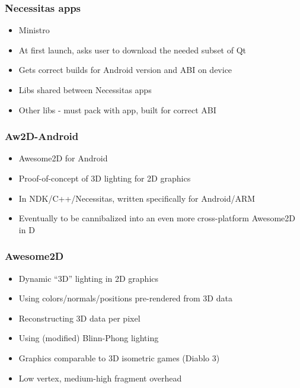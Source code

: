 \documentclass[ignorenonframetext]{beamer}
\begin{document}
\begin{frame}[fragile]
\frametitle{Necessitas apps}

\begin{itemize}

\item Ministro

\item At first launch, asks user to download the needed subset of Qt

\item Gets correct builds for Android version and ABI on device

\item Libs shared between Necessitas apps

\item Other libs - must pack with app, built for correct ABI
\end{itemize}
\end{frame}

\begin{frame}[fragile]
\frametitle{Aw2D-Android}

\begin{itemize}

\item Awesome2D for Android

\item Proof-of-concept of 3D lighting for 2D graphics

\item In NDK/C++/Necessitas, written specifically for Android/ARM

\item Eventually to be cannibalized into an even more cross-platform Awesome2D in D
\end{itemize}
\end{frame}

\begin{frame}[fragile]
\frametitle{Awesome2D}

\begin{itemize}

\item Dynamic ``3D'' lighting in 2D graphics

\item Using colors/normals/positions pre-rendered from 3D data

\item Reconstructing 3D data per pixel

\item Using (modified) Blinn-Phong lighting

\item Graphics comparable to 3D isometric games (Diablo 3)

\item Low vertex, medium-high fragment overhead
\end{itemize}
\end{frame}
\end{document}
